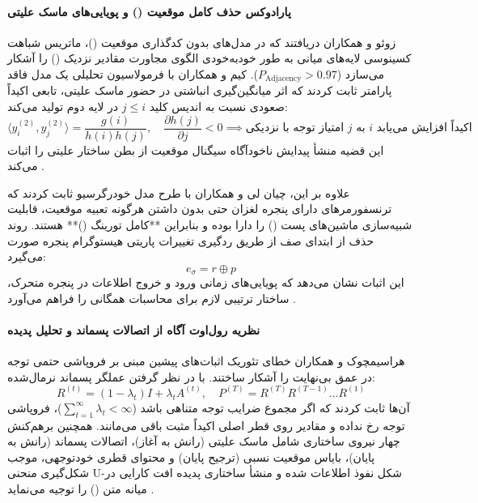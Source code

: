 \paragraph*{پارادوکس حذف کامل موقعیت () و پویایی‌های ماسک علیتی}
زوئو و همکاران \cite{zuo2025position} دریافتند که در مدل‌های بدون کدگذاری موقعیت ()، ماتریس شباهت کسینوسی لایه‌های میانی به طور خودبه‌خودی الگوی مجاورت مقادیر نزدیک () را آشکار می‌سازد ($P_{\text{Adjacency}} > 0.97$). کیم و همکاران \cite{kim2025behind} با فرمولاسیون تحلیلی یک مدل فاقد پارامتر ثابت کردند که اثر میانگین‌گیری انباشتی در حضور ماسک علیتی، تابعی اکیداً صعودی نسبت به اندیس کلید $j \le i$ در لایه دوم تولید می‌کند:
\begin{equation}
    \langle y_i^{(2)}, y_j^{(2)} \rangle = \frac{g(i)}{h(i)h(j)}, \quad \frac{\partial h(j)}{\partial j} < 0 \implies \text{امتیاز توجه با نزدیکی } j \text{ به } i \text{ اکیداً افزایش می‌یابد}
\end{equation}
این قضیه منشأ پیدایش ناخودآگاه سیگنال موقعیت از بطن ساختار علیتی را اثبات می‌کند \cite{kim2025behind}.

علاوه بر این، چیان لی و همکاران \cite{li2026rethinking} با طرح مدل خودرگرسیو  ثابت کردند که ترنسفورمرهای دارای پنجره لغزان حتی بدون داشتن هرگونه تعبیه موقعیت، قابلیت شبیه‌سازی ماشین‌های پست () را دارا بوده و بنابراین **کامل تورینگ ()** هستند. روند حذف از ابتدای صف از طریق ردگیری تغییرات پاریتی هیستوگرام پنجره صورت می‌گیرد:
\begin{equation}
    e_\sigma = r \oplus p
\end{equation}
این اثبات نشان می‌دهد که پویایی‌های زمانی ورود و خروج اطلاعات در پنجره متحرک، ساختار ترتیبی لازم برای محاسبات همگانی را فراهم می‌آورد \cite{li2026rethinking}.

\paragraph*{نظریه رول‌اوت آگاه از اتصالات پسماند و تحلیل پدیده }
هراسیمچوک و همکاران \cite{herasimchyk2026residual} خطای تئوریک اثبات‌های پیشین مبنی بر فروپاشی حتمی توجه در عمق بی‌نهایت را آشکار ساختند. با در نظر گرفتن عملگر پسماند نرمال‌شده:
\begin{equation}
    R^{(t)} = (1 - \lambda_t)I + \lambda_t A^{(t)}, \quad P^{(T)} = R^{(T)} R^{(T-1)} \dots R^{(1)}
\end{equation}
آن‌ها ثابت کردند که اگر مجموع ضرایب توجه متناهی باشد ($\sum_{t=1}^\infty \lambda_t < \infty$)، فروپاشی توجه رخ نداده و مقادیر روی قطر اصلی اکیداً مثبت باقی می‌مانند. همچنین برهم‌کنش چهار نیروی ساختاری شامل ماسک علیتی (رانش به آغاز)، اتصالات پسماند (رانش به پایان)، بایاس موقعیت نسبی (ترجیح پایان) و محتوای قطری خودتوجهی، موجب شکل‌گیری منحنی U-شکل نفوذ اطلاعات شده و منشأ ساختاری پدیده افت کارایی در میانه متن () را توجیه می‌نماید \cite{herasimchyk2026residual}.

